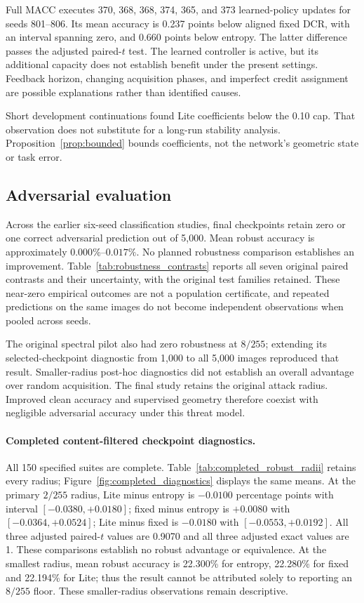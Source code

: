 \documentclass[10pt,a4paper,twocolumn]{article}
\begin{document}
Full MACC executes 370, 368, 368, 374, 365, and 373
learned-policy updates for seeds 801--806.
Its mean accuracy is 0.237 points below aligned fixed DCR,
with an interval spanning zero, and 0.660 points below entropy.
The latter difference passes the adjusted paired-$t$ test.
The learned controller is active, but its additional capacity
does not establish benefit under the present settings.
Feedback horizon, changing acquisition phases, and imperfect
credit assignment are possible explanations rather than
identified causes.

Short development continuations found Lite coefficients below
the 0.10 cap. That observation does not substitute for a
long-run stability analysis.
Proposition~\ref{prop:bounded} bounds coefficients,
not the network's geometric state or task error.

\subsection{Adversarial evaluation}\label{sec:robustness_results}

Across the earlier six-seed classification studies, final checkpoints
retain zero or one correct adversarial prediction out of 5,000. Mean robust accuracy is approximately
$0.000\%$--$0.017\%$.
No planned robustness comparison establishes an improvement.
Table~\ref{tab:robustness_contrasts} reports all seven original paired
contrasts and their uncertainty, with the original test families retained.
These near-zero empirical outcomes are not a population
certificate, and repeated predictions on the same images
do not become independent observations when pooled across seeds.

The original spectral pilot also had zero robustness at
$8/255$; extending its selected-checkpoint diagnostic from
1,000 to all 5,000 images reproduced that result.
Smaller-radius post-hoc diagnostics did not establish an
overall advantage over random acquisition.
The final study retains the original attack radius.
Improved clean accuracy and supervised geometry therefore coexist
with negligible adversarial accuracy under this threat model.


\paragraph{Completed content-filtered checkpoint diagnostics.}
All 150 specified suites are complete. Table~\ref{tab:completed_robust_radii}
retains every radius; Figure~\ref{fig:completed_diagnostics} displays the
same means. At the primary $2/255$ radius, Lite minus entropy is
$-0.0100$ percentage points with interval $[-0.0380,+0.0180]$;
fixed minus entropy is $+0.0080$ with $[-0.0364,+0.0524]$;
Lite minus fixed is $-0.0180$ with $[-0.0553,+0.0192]$.
All three adjusted paired-$t$ values are 0.9070 and all three adjusted
exact values are 1. These comparisons establish no robust advantage or
equivalence. At the smallest radius, mean robust accuracy is 22.300\%
for entropy, 22.280\% for fixed and 22.194\% for Lite; thus the result
cannot be attributed solely to reporting an $8/255$ floor. These
smaller-radius observations remain descriptive.
\end{document}
